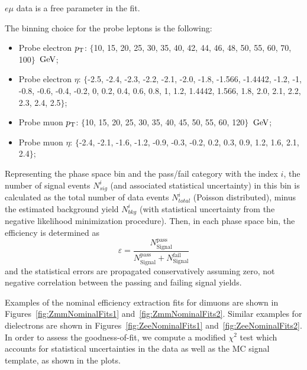 {\ensuremath{e\mu} data is a free parameter in the fit.

The binning choice for the probe leptons is the following:
\begin{itemize}
\item Probe electron $p_{\mathrm{T}}$: $\{$10, 15, 20, 25, 30, 35, 40, 42, 44, 46, 48, 50, 55, 60, 70, 100$\}$ $\,\text{Ge\hspace{-.08em}V}$;
\item Probe electron $\eta$: $\{$-2.5, -2.4, -2.3, -2.2, -2.1, -2.0, -1.8, -1.566, -1.4442, -1.2, -1, -0.8, -0.6, -0.4, -0.2, 0, 0.2, 0.4, 0.6, 0.8, 1, 1.2, 1.4442, 1.566, 1.8, 2.0, 2.1, 2.2, 2.3, 2.4, 2.5$\}$;
\item Probe muon $p_{\mathrm{T}}$: $\{$10, 15, 20, 25, 30, 35, 40, 45, 50, 55, 60, 120$\}$ $\,\text{Ge\hspace{-.08em}V}$;
\item Probe muon $\eta$: $\{$-2.4, -2.1, -1.6, -1.2, -0.9, -0.3, -0.2, 0.2, 0.3, 0.9, 1.2, 1.6, 2.1, 2.4$\}$;
\end{itemize}

Representing the phase space bin and the pass/fail category with the index $i$,
the number of signal events $N_{sig}^{i}$ (and associated statistical uncertainty) in this bin
is calculated as the total number of data events $N_{total}^{i}$ (Poisson distributed),
minus the estimated background yield $N_{bkg}^{i}$
(with statistical uncertainty from the negative likelihood minimization procedure).
Then, in each phase space bin, the efficiency is determined as
\begin{equation}
  \varepsilon = \frac{N_{\mathrm{Signal}}^{\mathrm{pass}}}{N_{\mathrm{Signal}}^{\mathrm{pass}}+N_{\mathrm{Signal}}^{\mathrm{fail}}}
\end{equation}
and the statistical errors are propagated conservatively assuming zero, not negative
correlation between the passing and failing signal yields.

Examples of the nominal efficiency extraction fits for dimuons are shown in Figures~\ref{fig:ZmmNominalFits1} and~\ref{fig:ZmmNominalFits2}.
Similar examples for dielectrons are shown in Figures~\ref{fig:ZeeNominalFits1} and~\ref{fig:ZeeNominalFits2}.
In order to assess the goodness-of-fit, we compute a modified $\chi^2$ test which accounts for
statistical uncertainties in the data as well as the MC signal template, as shown in the plots.

}
